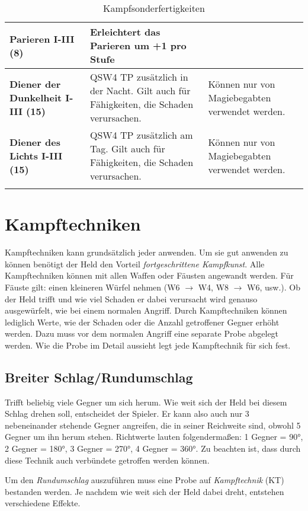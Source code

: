 \begin{longtable}{| p{4cm} | p{8cm} | p{3cm} |}
\hline
\textbf{Parieren I-III (8)} & Erleichtert das Parieren um +1 pro Stufe & \\

\hline
\textbf{Diener der Dunkelheit I-III (15)} & QSW4 TP zusätzlich in der Nacht. Gilt auch für Fähigkeiten, die Schaden verursachen. & Können nur von Magiebegabten verwendet werden. \\

\hline
\textbf{Diener des Lichts I-III (15)} & QSW4 TP zusätzlich am Tag. Gilt auch für Fähigkeiten, die Schaden verursachen. & Können nur von Magiebegabten verwendet werden. \\

\hline
\caption{Kampfsonderfertigkeiten}
\label{tab:Kampfsonderfertigkeiten}
\end{longtable}


\section{Kampftechniken}
Kampftechniken kann grundsätzlich jeder anwenden. Um sie gut anwenden zu können benötigt der Held den Vorteil \textit{fortgeschrittene Kampfkunst}. Alle Kampftechniken können mit allen Waffen oder Fäusten angewandt werden. Für Fäuste gilt: einen kleineren Würfel nehmen (W6 $\rightarrow$ W4, W8 $\rightarrow$ W6, usw.). Ob der Held trifft und wie viel Schaden er dabei verursacht wird genauso ausgewürfelt, wie bei einem normalen Angriff. Durch Kampftechniken können lediglich Werte, wie der Schaden oder die Anzahl getroffener Gegner erhöht werden. Dazu muss vor dem normalen Angriff eine separate Probe abgelegt werden. Wie die Probe im Detail aussieht legt jede Kampftechnik für sich fest.

\subsection{Breiter Schlag/Rundumschlag}
Trifft beliebig viele Gegner um sich herum. Wie weit sich der Held bei diesem Schlag drehen soll, entscheidet der Spieler. Er kann also auch nur 3 nebeneinander stehende Gegner angreifen, die in seiner Reichweite sind, obwohl 5 Gegner um ihn herum stehen. Richtwerte lauten folgendermaßen: 1 Gegner = 90°, 2 Gegner = 180°, 3 Gegner = 270°, 4 Gegner = 360°. Zu beachten ist, dass durch diese Technik auch verbündete getroffen werden können.

Um den \textit{Rundumschlag} auszuführen muss eine Probe auf \textit{Kampftechnik} (KT) bestanden werden. Je nachdem wie weit sich der Held dabei dreht, entstehen verschiedene Effekte.

